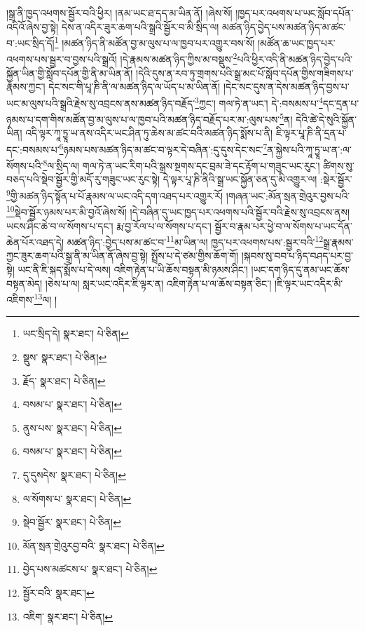 །སྒྲ་ནི་ཁྱད་འཕགས་སྦྱོར་བའི་ཕྱིར། །ནམ་ཡང་ཐ་དད་མ་ཡིན་ནོ། །ཞེས་སོ། །ཁྱད་པར་འཕགས་པ་ཡང་སློབ་དཔོན་འདིའོ་ཞེས་བྱ་སྟེ། དེས་ན་འདིར་ཟུར་ཆག་པའི་སྒྲའི་སྦྱོར་བ་མི་སྲིད་ལ། མཚན་ཉིད་བྱེད་པས་མཚན་ཉིད་མ་ཚང་བ་:ཡང་སྲིད་དོ།\footnote{ཡང་སྲིད་དེ།  སྣར་ཐང་།  པེ་ཅིན། } །མཚན་ཉིད་ནི་མཚོན་བྱ་མ་ལུས་པ་ལ་ཁྱབ་པར་འགྱུར་བས་སོ། །མཚོན་ཆ་ཡང་ཁྱད་པར་འཕགས་པས་སྦྱར་བ་བྱས་པའི་སྒྲའོ། །དེ་རྣམས་མཚན་ཉིད་ཀྱིས་མ་བསྡུས་\footnote{སྡུས་  སྣར་ཐང་།  པེ་ཅིན། }པའི་ཕྱིར་འདི་ནི་མཚན་ཉིད་བྱེད་པའི་སྐྱོན་ཡིན་གྱི་སློབ་དཔོན་གྱི་ནི་མ་ཡིན་ནོ། །དེའི་དུས་ན་རབ་ཏུ་གྲགས་པའི་སྒྲ་མང་པོ་སློབ་དཔོན་གྱིས་གཟིགས་པ་རྣམས་ཀྱང་། དེང་སང་གི་པཱ་ཎི་ནི་ལ་མཚན་ཉིད་ལ་ཡོད་པ་མ་ཡིན་ནོ། །དེང་སང་དུས་ན་དེས་མཚན་ཉིད་བྱས་པ་ཡང་མ་ལུས་པའི་སྒྲའི་རྗེས་སུ་འབྲངས་ནས་མཚན་ཉིད་བརྗོད་\footnote{རྗོད་  སྣར་ཐང་།  པེ་ཅིན། }ཀྱང་། གལ་ཏེ་ན་ཡང་། དེ་:བསམས་པ་\footnote{བསམ་པ་  སྣར་ཐང་།  པེ་ཅིན། }དང་དྲན་པ་ཉམས་པ་དག་གིས་མཚོན་བྱ་མ་ལུས་པ་ལ་ཁྱབ་པའི་མཚན་ཉིད་བརྗོད་པར་མ་:ལུས་པས་\footnote{ནུས་པས་  སྣར་ཐང་།  པེ་ཅིན། }ན། དེའི་ཚེ་དེ་སུའི་སྐྱོན་ཡིན། འདི་ལྟར་ཀཱ་ཏྱཱ་ཡ་ནས་འདིར་ཡང་ཤིན་ཏུ་ཆེས་མ་ཚང་བའི་མཚན་ཉིད་སྨོས་པ་ནི། ཇི་ལྟར་པཱ་ཎི་ནི་དྲན་པ་དང་:བསམས་པ་\footnote{བསམ་པ་  སྣར་ཐང་།  པེ་ཅིན། }ཉམས་པས་མཚན་ཉིད་མ་ཚང་བ་ལྟར་དེ་བཞིན་:དུ་དུས་དེང་སང་\footnote{དུ་དུསདེས་  སྣར་ཐང་།  པེ་ཅིན། }ན་སྐྱེས་པའི་ཀཱ་ཏྱཱ་ཡ་ན་:ལ་སོགས་པའི་\footnote{ལ་སོགས་པ་  སྣར་ཐང་།  པེ་ཅིན། }ལ་སྲིད་ལ། གལ་ཏེ་ན་ཡང་རིག་པའི་སྒྲས་སྔགས་དང་བྲམ་ཟེ་དང་རྟོག་པ་གཟུང་ཡང་རུང་། ཚིགས་སུ་བཅད་པའི་སྡེབ་སྦྱོར་གྱི་མདོ་རུ་གཟུང་ཡང་རུང་སྟེ། དེ་ལྟར་པཱ་ཎི་ནིའི་སྒྲ་ཡང་སྐྱོན་ཅན་དུ་མི་འགྱུར་ལ། :སྡེར་སྦྱོར་\footnote{སྡེབ་སྦྱོར་  སྣར་ཐང་།  པེ་ཅིན། }གྱི་མཚན་ཉིད་སྟོན་པ་པོ་རྣམས་ལ་ཡང་འདི་དག་འཐད་པར་འགྱུར་རོ། །གཞན་ཡང་:མོན་སྲན་གྲེའུར་བྱས་པའི་\footnote{མོན་སྲན་གྲེའུརབྱ་བའི་  སྣར་ཐང་།  པེ་ཅིན། }སྡེབ་སྦྱོར་ཉམས་པར་མི་བྱའོ་ཞེས་སོ། །དེ་བཞིན་དུ་ཡང་ཁྱད་པར་འཕགས་པའི་སྦྱོར་བའི་རྗེས་སུ་འབྲངས་ནས། ཡངས་ཤིང་ཆེ་བ་ལ་སོགས་པ་དང་། རྨ་བྱ་རོལ་པ་ལ་སོགས་པ་དང་། སྦྱོར་བ་རྣམ་པར་ཕྱེ་བ་ལ་སོགས་པ་ཡང་དོན་ཆེན་པོར་འཐད་དེ། མཚན་ཉིད་:བྱེད་པས་མ་ཚང་བ་\footnote{བྱེད་པས་མཚངས་པ་  སྣར་ཐང་།  པེ་ཅིན། }མ་ཡིན་ལ། ཁྱད་པར་འཕགས་པས་:སྦྱར་བའི་\footnote{སྦྱོར་བའི་  སྣར་ཐང་། }སྒྲ་རྣམས་ཀྱང་ཟུར་ཆག་པའི་སྒྲ་ནི་མ་ཡིན་ནོ་ཞེས་བྱ་སྟེ། སྤྲོས་པ་དེ་ཙམ་གྱིས་ཆོག་གོ། །སྐབས་སུ་བབ་པ་ཉིད་བཤད་པར་བྱ་སྟེ། ཡང་ནི་ཇི་སྐད་སྨོས་པ་དེ་ལས། འཇིག་རྟེན་པ་ཡི་ཆོས་བསྟན་མི་ཉམས་ཤིང་། །ཡང་དག་ཉིད་དུ་ནམ་ཡང་ཆོས་བསྟན་མེད། །ཅེས་པ་ལ། སླར་ཡང་འདིར་ཇི་ལྟར་ན། འཇིག་རྟེན་པ་ལ་ཆོས་བསྟན་ཅིང་། །ཇི་ལྟར་ཡང་འདིར་མི་འཇིགས་\footnote{འཇིག་  སྣར་ཐང་།  པེ་ཅིན། }ལ། །
